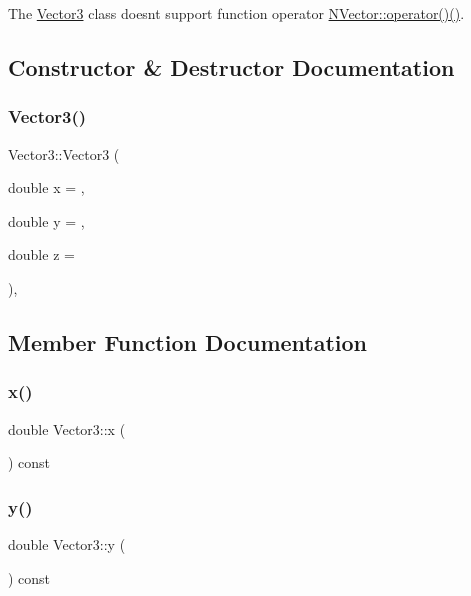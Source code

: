 The {\ttfamily \mbox{\hyperlink{class_vector3}{Vector3}}} class doesn\textquotesingle{}t support function operator {\ttfamily \mbox{\hyperlink{class_n_vector_a3ed21b63fd97af9c63bfacb372f733a5}{N\+Vector\+::operator()()}}}. 

\subsection{Constructor \& Destructor Documentation}
\mbox{\label{class_vector3_a6151fc844ddb2aaa316317b922cb8d22}} 
\subsubsection{\texorpdfstring{Vector3()}{Vector3()}}
{\footnotesize\ttfamily Vector3\+::\+Vector3 (\begin{DoxyParamCaption}\item[{double}]{x = {},  }\item[{double}]{y = {},  }\item[{double}]{z = {} }\end{DoxyParamCaption})\hspace{0.3cm}{\ttfamily [inline]}, {\ttfamily [explicit]}}



\subsection{Member Function Documentation}
\mbox{\label{class_vector3_a58680da7b1109919f9912cc8c5d4d54d}} 
\subsubsection{\texorpdfstring{x()}{x()}}
{\footnotesize\ttfamily double Vector3\+::x (\begin{DoxyParamCaption}{ }\end{DoxyParamCaption}) const\hspace{0.3cm}{\ttfamily [inline]}}

\mbox{\label{class_vector3_aa86961f470134f1c7ca3eec7a88ad069}} 
\subsubsection{\texorpdfstring{y()}{y()}}
{\footnotesize\ttfamily double Vector3\+::y (\begin{DoxyParamCaption}{ }\end{DoxyParamCaption}) const\hspace{0.3cm}{\ttfamily [inline]}}

